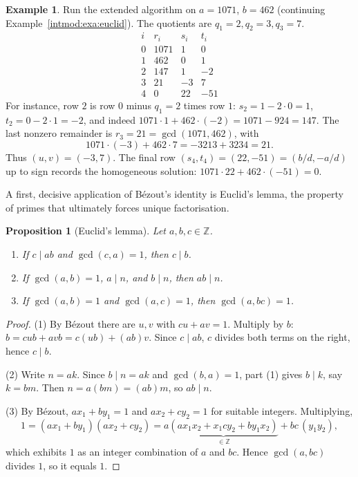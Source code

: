 \documentclass[11pt,a4paper]{article}
\newtheorem{proposition}[theorem]{Proposition}
\theoremstyle{definition}
\newtheorem{example}[theorem]{Example}
\theoremstyle{remark}
\newcommand{\Z}{\ensuremath{\mathbb{Z}}}
\begin{document}
\begin{example}\label{intmod:exa:exteuclid}
Run the extended algorithm on \(a=1071\), \(b=462\) (continuing Example~\ref{intmod:exa:euclid}). The quotients are \(q_1=2,q_2=3,q_3=7\).
\[
\begin{array}{c|c|c|c}
i & r_i & s_i & t_i \\\hline
0 & 1071 & 1 & 0 \\
1 & 462 & 0 & 1 \\
2 & 147 & 1 & -2 \\
3 & 21 & -3 & 7 \\
4 & 0 & 22 & -51
\end{array}
\]
For instance, row \(2\) is row \(0\) minus \(q_1=2\) times row \(1\): \(s_2=1-2\cdot0=1\), \(t_2=0-2\cdot1=-2\), and indeed \(1071\cdot1+462\cdot(-2)=1071-924=147\). The last nonzero remainder is \(r_3=21=\gcd(1071,462)\), with
\[
1071\cdot(-3) + 462\cdot 7 = -3213 + 3234 = 21.
\]
Thus \((u,v)=(-3,7)\). The final row \((s_4,t_4)=(22,-51)=(b/d,-a/d)\) up to sign records the homogeneous solution: \(1071\cdot 22 + 462\cdot(-51)=0\).
\end{example}

A first, decisive application of Bézout's identity is Euclid's lemma, the property of primes that ultimately forces unique factorisation.

\begin{proposition}[Euclid's lemma]\label{intmod:prop:euclidlemma}
Let \(a,b,c\in\Z\).
\begin{enumerate}
\item If \(c\mid ab\) and \(\gcd(c,a)=1\), then \(c\mid b\).
\item If \(\gcd(a,b)=1\), \(a\mid n\), and \(b\mid n\), then \(ab\mid n\).
\item If \(\gcd(a,b)=1\) and \(\gcd(a,c)=1\), then \(\gcd(a,bc)=1\).
\end{enumerate}
\end{proposition}

\begin{proof}
(1) By Bézout there are \(u,v\) with \(cu+av=1\). Multiply by \(b\): \(b=cub+avb=c(ub)+(ab)v\). Since \(c\mid ab\), \(c\) divides both terms on the right, hence \(c\mid b\).

(2) Write \(n=ak\). Since \(b\mid n=ak\) and \(\gcd(b,a)=1\), part (1) gives \(b\mid k\), say \(k=bm\). Then \(n=a(bm)=(ab)m\), so \(ab\mid n\).

(3) By Bézout, \(ax_1+by_1=1\) and \(ax_2+cy_2=1\) for suitable integers. Multiplying,
\[
1=(ax_1+by_1)(ax_2+cy_2)=a\underbrace{(ax_1x_2+x_1cy_2+by_1x_2)}_{\in\Z}+bc\,(y_1y_2),
\]
which exhibits \(1\) as an integer combination of \(a\) and \(bc\). Hence \(\gcd(a,bc)\) divides \(1\), so it equals \(1\).
\end{proof}
\end{document}

